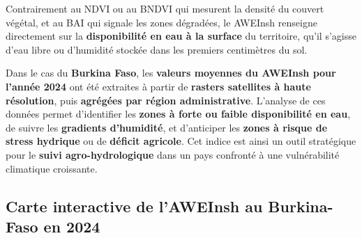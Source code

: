 \documentclass[
]{book}
\begin{document}
Contrairement au NDVI ou au BNDVI qui mesurent la densité du couvert végétal, et au BAI qui signale les zones dégradées, le AWEInsh renseigne directement sur la \textbf{disponibilité en eau à la surface} du territoire, qu'il s'agisse d'eau libre ou d'humidité stockée dans les premiers centimètres du sol.

Dans le cas du \textbf{Burkina Faso}, les \textbf{valeurs moyennes du AWEInsh pour l'année 2024} ont été extraites à partir de \textbf{rasters satellites à haute résolution}, puis \textbf{agrégées par région administrative}. L'analyse de ces données permet d'identifier les \textbf{zones à forte ou faible disponibilité en eau}, de suivre les \textbf{gradients d'humidité}, et d'anticiper les \textbf{zones à risque de stress hydrique} ou de \textbf{déficit agricole}. Cet indice est ainsi un outil stratégique pour le \textbf{suivi agro-hydrologique} dans un pays confronté à une vulnérabilité climatique croissante.

\subsection{Carte interactive de l'AWEInsh au Burkina-Faso en 2024}\label{carte-interactive-de-laweinsh-au-burkina-faso-en-2024}
\end{document}
